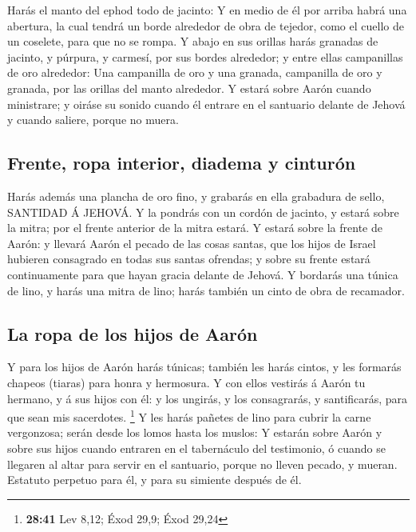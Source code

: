  Harás el manto del ephod todo de jacinto:  Y
en medio de él por arriba habrá una abertura, la cual tendrá un borde
alrededor de obra de tejedor, como el cuello de un coselete, para que no
se rompa.  Y abajo en sus orillas harás granadas de
jacinto, y púrpura, y carmesí, por sus bordes alrededor; y entre ellas
campanillas de oro alrededor:  Una campanilla de oro y una
granada, campanilla de oro y granada, por las orillas del manto
alrededor.  Y estará sobre Aarón cuando ministrare; y
oiráse su sonido cuando él entrare en el santuario delante de Jehová y
cuando saliere, porque no muera.

\hypertarget{frente-ropa-interior-diadema-y-cinturuxf3n}{%
\subsection{Frente, ropa interior, diadema y
cinturón}\label{frente-ropa-interior-diadema-y-cinturuxf3n}}

 Harás además una plancha de oro fino, y grabarás en ella
grabadura de sello, SANTIDAD Á JEHOVÁ.  Y la pondrás con un
cordón de jacinto, y estará sobre la mitra; por el frente anterior de la
mitra estará.  Y estará sobre la frente de Aarón: y llevará
Aarón el pecado de las cosas santas, que los hijos de Israel hubieren
consagrado en todas sus santas ofrendas; y sobre su frente estará
continuamente para que hayan gracia delante de Jehová.  Y
bordarás una túnica de lino, y harás una mitra de lino; harás también un
cinto de obra de recamador.

\hypertarget{la-ropa-de-los-hijos-de-aaruxf3n}{%
\subsection{La ropa de los hijos de
Aarón}\label{la-ropa-de-los-hijos-de-aaruxf3n}}

 Y para los hijos de Aarón harás túnicas; también les harás
cintos, y les formarás chapeos (tiaras) para honra y hermosura.
 Y con ellos vestirás á Aarón tu hermano, y á sus hijos con
él: y los ungirás, y los consagrarás, y santificarás, para que sean mis
sacerdotes. \footnote{\textbf{28:41} Lev 8,12; Éxod 29,9; Éxod 29,24}
 Y les harás pañetes de lino para cubrir la carne
vergonzosa; serán desde los lomos hasta los muslos:  Y
estarán sobre Aarón y sobre sus hijos cuando entraren en el tabernáculo
del testimonio, ó cuando se llegaren al altar para servir en el
santuario, porque no lleven pecado, y mueran. Estatuto perpetuo para él,
y para su simiente después de él.

